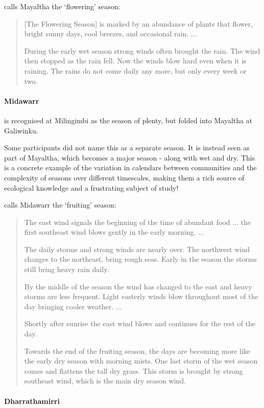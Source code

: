 \citet{davis1989} calls Mayaltha the `flowering' season:
\blockquote{
    [The Flowering Season] is marked by an abundance of plants that flower,
    bright sunny days, cool breezes, and occasional rain. ...
    
    During the early wet season strong winds often brought the rain.
    The wind then stopped as the rain fell.
    Now the winds blow hard even when it is raining.
    The rains do not come daily any more, but only every week or two.
}


\paragraph{Midawarr} is recognised at Milingimbi as the season of plenty,
but folded into Mayaltha at Galiwinku.

Some participants did not name this as a separate season.
It is instead seen as part of Mayaltha, which becomes a major season - along with wet and dry.
This is a concrete example of the variation in calendars between
communities and the complexity of seasons over different timescales,
making them a rich source of ecological knowledge and a frustrating subject of study!

\citet{davis1989} calls Midawarr the `fruiting' season:
\blockquote{
    The east wind signals the beginning of the time of abundant food ...
    the first southeast wind blows gently in the early morning. ...
    
    The daily storms and strong winds are nearly over.
    The northwest wind changes to the northeast, bring rough seas.
    Early in the season the storms still bring heavy rain daily.
    
    By the middle of the season the wind has changed to the east and heavy storms are less frequent.
    Light easterly winds blow throughout most of the day bringing cooler weather. ...
    
    Shortly after sunrise the east wind blows and continues for the rest of the day.
    
    Towards the end of the fruiting season, the days are becoming
    more like the early dry season with morning mists.
    One last storm of the wet season comes and flattens the tall dry grass.
    This storm is brought by strong southeast wind, which is the main dry season wind.
}


\paragraph{Dharrathamirri}


